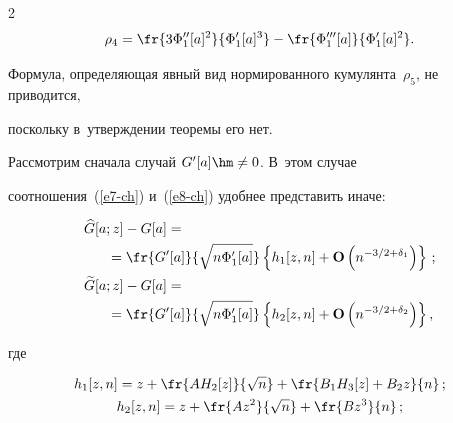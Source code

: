 \begin{multicols}{2}
\begin{equation}
 \rho_4  = \fr{3 \Phi''_1[a]^2 }{\Phi'_1[a]^3}


 - \fr{\Phi'''_1[a]}{\Phi'_1[a]^2 }.


 \label{e11-ch}


 \end{equation}


 Формула, определяющая явный вид нормированного кумулянта~$\rho_5$, не приводится,


 поскольку в~утверждении теоремы его нет.





  Рассмотрим сначала случай $G'[a]\hm\neq 0$. В~этом случае 


  соотношения~(\ref{e7-ch}) и~(\ref{e8-ch}) удобнее представить иначе:


 \begin{align}


  \widehat{G}[a;z]-G[a]&={}\notag\\


  &\hspace*{-15mm}{}=\fr{G'[a]}{\sqrt {n\Phi'_1 [a] }} \left\{


  h_1[z,n] + \mathbf{O}\left( {n^{- 3/2+\delta_1} } \right) \right\}\,;


\label{e12-ch}


 \\ 


 \widetilde{G}[a;z]-G[a]&= {}\notag\\


&\hspace*{-15mm}{}= \fr{G'[a]}{\sqrt {n\Phi '_1 [a]} }


    \left\{ h_2[z,n] + \mathbf{O}\left(n^{ - 3/2+\delta_2}\right)


  \right\}, \notag %


  \end{align}


 где


 \begin{gather*}


h_1[z,n]= z


 + \fr{A H_2[z]}{\sqrt{n}}  + \fr{B_1 H_3[z]+B_2 z}{n}\,;


 \notag \\


h_2[z,n]= z + \fr{A z^2}{\sqrt {n }} + \fr{B z^3}{n}\,;\\





\end{gather*}
\end{multicols}
